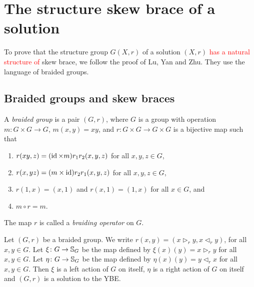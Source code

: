 \chapter{The structure skew brace of a solution}
\label{structure_brace}


To prove that the structure group $G(X,r)$ of a solution $(X,r)$ \textcolor{red}{has a natural structure of} skew brace, we follow the 
proof of Lu, Yan and Zhu. They use the language of braided groups.

\section{Braided groups and skew braces}

\begin{definition}\label{braidedgroup}
A \emph{braided group} is a pair $(G,r)$, where 
$G$ is a group with operation $m\colon G\times G\to G$, $m(x,y)=xy$, and 
$r\colon G\times G\to G\times G$ is a bijective map such that
\begin{enumerate}
\item $r(xy,z)=(\operatorname{id}\times m)r_1r_2(x,y,z)$ for all $x,y,z\in G$,
\item $r(x,yz)=(m\times\operatorname{id})r_2r_1(x,y,z)$ for all $x,y,z\in G$,
\item $r(1,x)=(x,1)$ and $r(x,1)=(1,x)$ for all $x\in G$, and 
\item $m\circ r=m$.
\end{enumerate}
The map $r$ is called a \emph{braiding operator} on $G$. 
\end{definition}

\begin{lemma}
\label{lem:braidedsolYBE}
Let $(G,r)$ be a braided group. We write $r(x,y)=(x\rhd_r y,x\lhd_r y)$, for all $x,y\in G$. Let $\xi\colon G\rightarrow \mathbb{S}_G$ be the map defined by $\xi(x)(y)=x\rhd_r y$ for all $x,y\in G$. Let $\eta\colon G\rightarrow \mathbb{S}_G$ be the map defined by $\eta(x)(y)=y\lhd_r x$ for all $x,y\in G$. Then $\xi$ is a left action of $G$ on itself, $\eta$ is a right action of $G$ on itself and $(G,r)$ is a solution to the YBE. 
\end{lemma}

